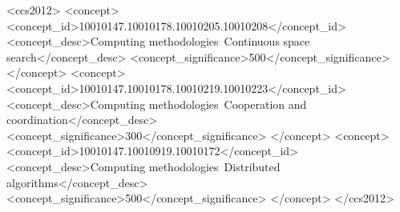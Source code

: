 \documentclass[sigconf]{acmart}
\begin{document}
%
%
\begin{CCSXML}
  <ccs2012>
  <concept>
  <concept_id>10010147.10010178.10010205.10010208</concept_id>
  <concept_desc>Computing methodologies~Continuous space search</concept_desc>
  <concept_significance>500</concept_significance>
  </concept>
  <concept>
  <concept_id>10010147.10010178.10010219.10010223</concept_id>
  <concept_desc>Computing methodologies~Cooperation and coordination</concept_desc>
  <concept_significance>300</concept_significance>
  </concept>
  <concept>
  <concept_id>10010147.10010919.10010172</concept_id>
  <concept_desc>Computing methodologies~Distributed algorithms</concept_desc>
  <concept_significance>500</concept_significance>
  </concept>
  </ccs2012>
  \end{CCSXML}
  



\maketitle




 
\end{document}
